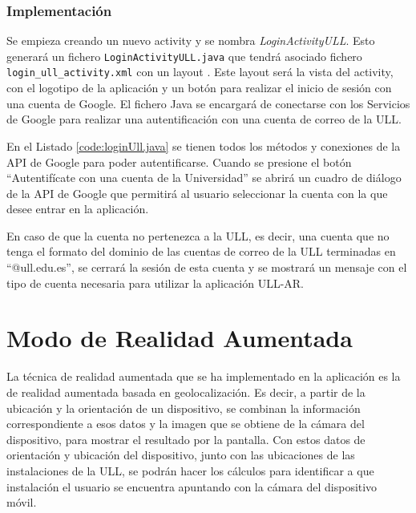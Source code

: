 \subsubsection{ Implementación }


Se empieza creando un nuevo activity y se nombra \textit{LoginActivityULL}. Esto  generará un fichero \texttt{LoginActivityULL.java} que tendrá asociado fichero \texttt{login\_ull\_activity.xml} con un layout \cite{URL::layout}. Este layout será la vista del activity, con el logotipo de la aplicación y un botón para realizar el inicio de sesión con una cuenta de Google. El fichero Java se encargará de conectarse con los Servicios de Google para realizar una autentificación con una cuenta de correo de la ULL.
\bigskip
\bigskip
 
En el Listado \ref{code:loginUll.java} se tienen todos los métodos y conexiones de la API de Google para poder autentificarse. Cuando se presione el botón ``Autentifícate con una cuenta de la Universidad'' se abrirá un cuadro de diálogo de la API de Google que permitirá al usuario seleccionar la cuenta con la que desee entrar en la aplicación. 

En caso de que la cuenta no pertenezca a la ULL, es decir, una cuenta que no tenga el formato del dominio de las cuentas de correo de la ULL terminadas en ``@ull.edu.es'', se cerrará la sesión de esta cuenta y se mostrará un mensaje con el tipo de cuenta necesaria para utilizar la aplicación ULL-AR.

 
 
\section{Modo de Realidad Aumentada}

La técnica de realidad aumentada que se ha implementado en la aplicación es la de realidad aumentada basada en geolocalización. Es decir, a partir de la ubicación y la orientación de un dispositivo, se combinan la información correspondiente a esos datos y la imagen que se obtiene de la cámara del dispositivo, para mostrar el resultado por la pantalla. Con estos datos de orientación y ubicación del dispositivo, junto con las ubicaciones de las instalaciones de la ULL, se podrán hacer los cálculos para identificar a que instalación el usuario se encuentra apuntando con la cámara del dispositivo móvil.

